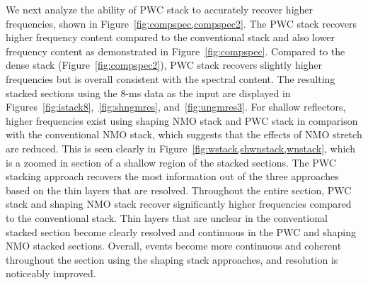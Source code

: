 We next analyze the ability of PWC stack to accurately recover higher frequencies, shown in Figure~\ref{fig:compspec,compspec2}.
The PWC stack recovers higher frequency content compared to the conventional stack and also lower frequency content as 
demonstrated in Figure~\ref{fig:compspec}. Compared to the dense stack (Figure~\ref{fig:compspec2}), PWC stack
recovers slightly higher frequencies but is overall consistent with the spectral content.
The resulting stacked sections using the 8-ms data as the input are displayed in Figures~\ref{fig:istack8},~\ref{fig:shngmres}, and~\ref{fig:ungmres3}. 
For shallow reflectors, higher frequencies exist using shaping NMO stack and PWC stack in comparison with 
the conventional NMO stack, which suggests that the effects of NMO stretch are reduced. This is seen clearly 
in Figure~\ref{fig:wstack,shwnstack,wnstack}, which is a zoomed in section of a shallow region of the stacked sections.
The PWC stacking approach recovers the most information out of the three approaches based on the thin layers that
are resolved. Throughout the entire section, PWC stack and shaping NMO stack recover significantly higher frequencies compared to 
the conventional stack. Thin layers that are unclear in the conventional stacked section become clearly resolved 
and continuous in the PWC and shaping NMO stacked sections. Overall, events become more continuous and coherent throughout 
the section using the shaping stack approaches, and resolution is noticeably improved. 






